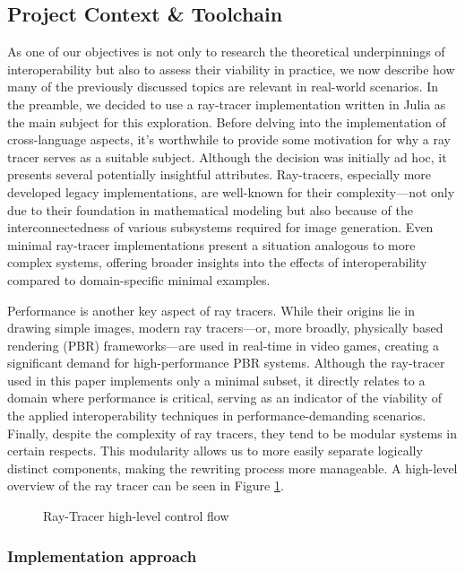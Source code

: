 \subsection{Project Context \& Toolchain}


As one of our objectives is not only to research the theoretical underpinnings of interoperability but also to assess their viability in practice, we now describe how many of the previously discussed topics are relevant in real-world scenarios. In the preamble, we decided to use a ray-tracer implementation written in Julia as the main subject for this exploration. Before delving into the implementation of cross-language aspects, it's worthwhile to provide some motivation for why a ray tracer serves as a suitable subject. Although the decision was initially ad hoc, it presents several potentially insightful attributes. Ray-tracers, especially more developed legacy implementations, are well-known for their complexity—not only due to their foundation in mathematical modeling but also because of the interconnectedness of various subsystems required for image generation. Even minimal ray-tracer implementations present a situation analogous to more complex systems, offering broader insights into the effects of interoperability compared to domain-specific minimal examples. 

Performance is another key aspect of ray tracers. While their origins lie in drawing simple images, modern ray tracers—or, more broadly, physically based rendering (PBR) frameworks—are used in real-time in video games, creating a significant demand for high-performance PBR systems. Although the ray-tracer used in this paper implements only a minimal subset, it directly relates to a domain where performance is critical, serving as an indicator of the viability of the applied interoperability techniques in performance-demanding scenarios. Finally, despite the complexity of ray tracers, they tend to be modular systems in certain respects. This modularity allows us to more easily separate logically distinct components, making the rewriting process more manageable. A high-level overview of the ray tracer can be seen in Figure \ref{fig:simple_rt_impl}.

\begin{figure}[ht!]
  \centering
  
  \caption{Ray-Tracer high-level control flow}
  \label{fig:simple_rt_impl}
  \Description{}
\end{figure}

\subsubsection{Implementation approach}

